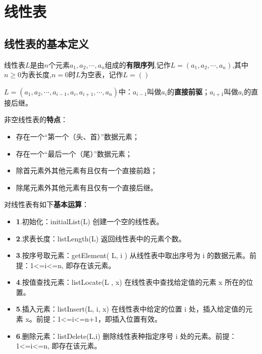 \documentclass[a4paper]{ltxdoc}
\begin{document}
\section{线性表}
\subsection{线性表的基本定义}
\par 线性表$L$是由$n$个元素$a_1,a_2,\cdots,a_n$组成的\textbf{有限序列},记作$L=(a_1,a_2,\cdots,a_n)$,其中$n\geq 0$为表长度,$n=0$时$L$为空表，记作$L=()$
\par $L=(a_1,a_2,\cdots,a_{i-1},a_i,a_{i+1},\cdots,a_n)$中：$a_{i-1}$叫做$a_i$的\textbf{直接前驱}；$a_{i+1}$叫做$a_i$的直接后继。
\par 非空线性表的\textbf{特点}：
\begin{itemize}
    \item 存在一个“第一个（头、首）”数据元素；
    \item 存在一个“最后一个（尾）”数据元素；
    \item 除首元素外其他元素有且仅有一个直接前趋；
    \item 除尾元素外其他元素有且仅有一个直接后继。
\end{itemize}
\par 对线性表有如下\textbf{基本运算}：                          
\begin{itemize}
    \item \textbf{1}.初始化：initialList(L) 创建一个空的线性表。
    \item \textbf{2}.求表长度：listLength(L) 返回线性表中的元素个数。
    \item \textbf{3}.按序号取元素：getElement( L, i ) 从线性表中取出序号为 i 的数据元素。前提：1<=i<=n, 即存在该元素。
    \item \textbf{4}.按值查找元素：listLocate(L , x) 在线性表中查找给定值的元素 x 所在的位置。
    \item \textbf{5}.插入元素：listInsert(L, i, x) 在线性表中给定的位置 i  处，插入给定值的元素 x。前提：1<=i<=n+1，即插入位置有效。
    \item \textbf{6}.删除元素：listDelete(L,i) 删除线性表种指定序号 i 处的元素。前提：1<=i<=n, 即存在该元素。
\end{itemize}
\end{document}
